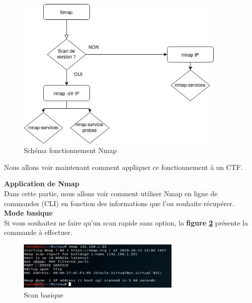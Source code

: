 \begin{figure}[htp!]
  \centering
  \setlength\figureheight{7cm}
  \setlength\figurewidth{9cm}
  \includegraphics[width=0.9\textwidth]{oui/images/nmap/basenmapdiag.png}
  \caption{Schéma fonctionnement Nmap}
  \label{fig:fonctionnementnmap}
\end{figure}

Nous allons voir maintenant comment appliquer ce fonctionnement à un CTF.

 \textbf{Application de Nmap}\\

Dans cette partie, nous allons voir comment utiliser Nmap en ligne de commandes (CLI) en fonction des informations que l'on souhaite récupérer.\\

 \textbf{Mode basique}\\

Si vous souhaitez ne faire qu'un scan rapide sans option, la \textbf{figure \ref{fig:scanbasique}} présente la commande à effectuer.

\begin{figure}[htp!]
  \centering
  \setlength\figureheight{7cm}
  \setlength\figurewidth{9cm}
  \includegraphics[width=0.7\textwidth]{oui/Ancien/imangeancien/Nmap/justeip.PNG}
  \caption{Scan basique}
  \label{fig:scanbasique}
\end{figure}

